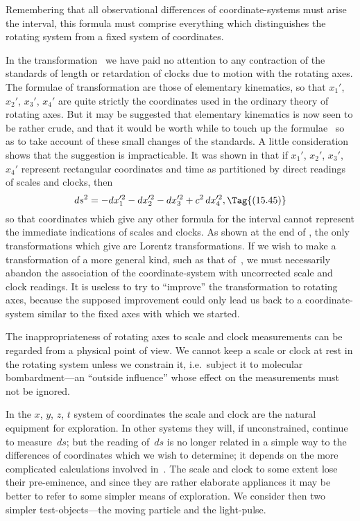 \documentclass[12pt]{book}
\begin{document}
Remembering that all observational differences of co\-ord\-inate-systems must
arise  the interval, this formula must comprise everything which distinguishes
the rotating system from a fixed system of coordinates.

In the transformation~ we have paid no attention to any contraction
of the standards of length or retardation of clocks due to motion with the
rotating axes. The formulae of transformation are those of elementary
kinematics, so that $x_{1}'$, $x_{2}'$, $x_{3}'$, $x_{4}'$ are quite strictly the coordinates used in
the ordinary theory of rotating axes. But it may be suggested that elementary
kinematics is now seen to be rather crude, and that it would be worth while
to touch up the formulae~ so as to take account of these small changes
of the standards. A little consideration shows that the suggestion is impracticable.
It was shown in  that if $x_{1}'$, $x_{2}'$, $x_{3}'$, $x_{4}'$ represent rectangular
coordinates and time as partitioned by direct readings of scales and clocks, then
\[
ds^{2} = -dx_{1}'^{2} - dx_{2}'^{2} - dx_{3}'^{2} + c^{2}\, dx_{4}'^{2},
\Tag{(15.45)}
\]
so that coordinates which give any other formula for the interval cannot
represent the immediate indications of scales and clocks. As shown at the
end of , the only transformations which give  are Lorentz transformations.
If we wish to make a transformation of a more general kind, such
as that of~, we must necessarily abandon the association of the coordinate-system
with uncorrected scale and clock readings. It is useless to try to
``improve'' the transformation to rotating axes, because the supposed improvement
could only lead us back to a coordinate-system similar to the fixed
axes with which we started.

The inappropriateness of rotating axes to scale and clock measurements
can be regarded from a physical point of view. We cannot keep a scale or
clock at rest in the rotating system unless we constrain it, i.e.\ subject it to
molecular bombardment---an ``outside influence'' whose effect on the measurements
must not be ignored.

In the $x$, $y$, $z$, $t$ system of coordinates the scale and clock are the natural
equipment for exploration. In other systems they will, if unconstrained, continue
to measure~$ds$; but the reading of~$ds$ is no longer related in a simple
way to the differences of coordinates which we wish to determine; it depends
on the more complicated calculations involved in~. The scale and clock
to some extent lose their pre-eminence, and since they are rather elaborate
appliances it may be better to refer to some simpler means of exploration.
We consider then two simpler test-objects---the moving particle and the
%
%
light-pulse.
\end{document}
